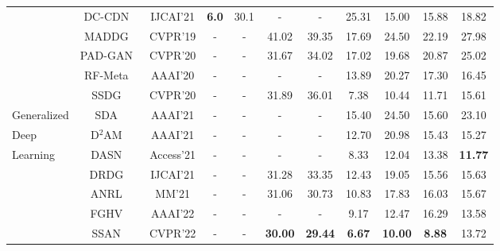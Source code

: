 \documentclass[10pt,journal,compsoc]{IEEEtran}
\begin{document}
\begin{table}[!htb]
{\begin{tabular}{l|c|c|c|c|c|c|c|c|c|c}
   & DC-CDN~\cite{yu2021dual} & IJCAI'21 & \textbf{6.0} & 30.1  &  - & -  & 25.31 & 15.00  & 15.88 & 18.82
   \\ \cline{1-11}


   
   & MADDG~\cite{shao2019multi} & CVPR'19  &  - & -  & 41.02 & 39.35 & 17.69 & 24.50  & 22.19 & 27.98
    \\ \cline{2-11}
    
    & PAD-GAN~\cite{wang2020cross} & CVPR'20  &  - & -  & 31.67 & 34.02 & 17.02 & 19.68  & 20.87 & 25.02
    \\ \cline{2-11}
    
  
    
   
   & RF-Meta~\cite{shao2019regularized} & AAAI'20  &  - & -  &  - & -  & 13.89 & 20.27  & 17.30 & 16.45
    \\ \cline{2-11}
    
    
   & SSDG~\cite{jia2020single} & CVPR'20  &  - & -  & 31.89 & 36.01 & 7.38 &  10.44  & 11.71 & 15.61
    \\ \cline{2-11}
    
   Generalized
   & SDA~\cite{wang2021self} & AAAI'21  &   - & -  &  - & -  & 15.40 & 24.50  & 15.60 & 23.10
    \\ \cline{2-11}
    
    \quad Deep
   & D$^2$AM~\cite{chen2021generalized} & AAAI'21  &  - & -  &  - & -  & 12.70 & 20.98  & 15.43 & 15.27
    \\ \cline{2-11}
    
    Learning
      & DASN~\cite{kim2020suppressing} & Access'21  &   - & -  &  - & -  & 8.33 & 12.04  & 13.38 & \textbf{11.77}
    \\ \cline{2-11}
    
    
    & DRDG~\cite{liu2021dual} & IJCAI'21  &  - & -  &  31.28 & 33.35 & 12.43 & 19.05  & 15.56 & 15.63
    \\ \cline{2-11}
    
    & ANRL~\cite{liu2021adaptive} & MM'21  &  - & -  & 31.06 & 30.73 & 10.83 & 17.83  & 16.03 & 15.67
     \\ \cline{2-11}
    
    & FGHV~\cite{liu2022feature} & AAAI'22  &  - & -  & - & - & 9.17 & 12.47  & 16.29 & 13.58
    
    \\ \cline{2-11}
    
    & SSAN~\cite{wang2022domain} & CVPR'22  &  - & -  &  \textbf{30.00} & \textbf{29.44} & \textbf{6.67} & \textbf{10.00}  & \textbf{8.88} & 13.72
    
   
   
    \\ 
    
	\bottomrule[1pt]	
	\end{tabular}}
	
    \label{tab:semi_DG_intra}
    \vspace{-0.2em}
\end{table}
\end{document}
